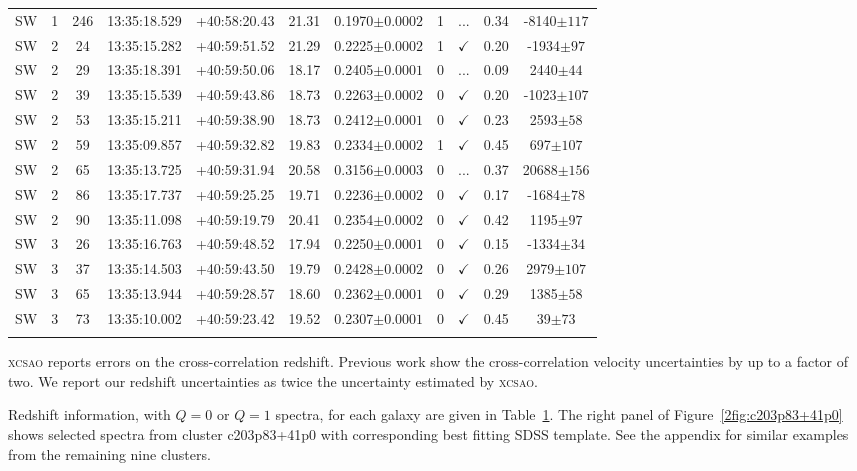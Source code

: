 \begin{landscape}
\begin{longtable}{ccccccccccc}
	SW & 1 & 246 & 13:35:18.529 & +40:58:20.43 & 21.31 & 0.1970$\pm{0.0002}$ & 1 & ... & 0.34 & -8140$\pm{117}$ \\
	SW & 2 & 24 & 13:35:15.282 & +40:59:51.52 & 21.29 & 0.2225$\pm{0.0002}$ & 1 & $\checkmark$ & 0.20 & -1934$\pm{97}$ \\
	SW & 2 & 29 & 13:35:18.391 & +40:59:50.06 & 18.17 & 0.2405$\pm{0.0001}$ & 0 & ... & 0.09 & 2440$\pm{44}$ \\
	SW & 2 & 39 & 13:35:15.539 & +40:59:43.86 & 18.73 & 0.2263$\pm{0.0002}$ & 0 & $\checkmark$ & 0.20 & -1023$\pm{107}$ \\
	SW & 2 & 53 & 13:35:15.211 & +40:59:38.90 & 18.73 & 0.2412$\pm{0.0001}$ & 0 & $\checkmark$ & 0.23 & 2593$\pm{58}$ \\
	SW & 2 & 59 & 13:35:09.857 & +40:59:32.82 & 19.83 & 0.2334$\pm{0.0002}$ & 1 & $\checkmark$ & 0.45 & 697$\pm{107}$ \\
	SW & 2 & 65 & 13:35:13.725 & +40:59:31.94 & 20.58 & 0.3156$\pm{0.0003}$ & 0 & ... & 0.37 & 20688$\pm{156}$ \\
	SW & 2 & 86 & 13:35:17.737 & +40:59:25.25 & 19.71 & 0.2236$\pm{0.0002}$ & 0 & $\checkmark$ & 0.17 & -1684$\pm{78}$ \\
	SW & 2 & 90 & 13:35:11.098 & +40:59:19.79 & 20.41 & 0.2354$\pm{0.0002}$ & 0 & $\checkmark$ & 0.42 & 1195$\pm{97}$ \\
	SW & 3 & 26 & 13:35:16.763 & +40:59:48.52 & 17.94 & 0.2250$\pm{0.0001}$ & 0 & $\checkmark$ & 0.15 & -1334$\pm{34}$ \\
	SW & 3 & 37 & 13:35:14.503 & +40:59:43.50 & 19.79 & 0.2428$\pm{0.0002}$ & 0 & $\checkmark$ & 0.26 & 2979$\pm{107}$ \\
	SW & 3 & 65 & 13:35:13.944 & +40:59:28.57 & 18.60 & 0.2362$\pm{0.0001}$ & 0 & $\checkmark$ & 0.29 & 1385$\pm{58}$ \\
	SW & 3 & 73 & 13:35:10.002 & +40:59:23.42 & 19.52 & 0.2307$\pm{0.0001}$ & 0 & $\checkmark$ & 0.45 & 39$\pm{73}$ \\
	\hline 
	\label{2tbl:c203p83+41p0} 
	\end{longtable}
\end{landscape}


\textsc{xcsao} reports errors on the cross-correlation redshift. Previous work  show the cross-correlation velocity uncertainties by up to a factor of two. We report our redshift uncertainties as twice the uncertainty estimated by \textsc{xcsao}.

Redshift information, with $Q=0$ or $Q=1$ spectra, for each galaxy are given in Table~\ref{2tbl:c203p83+41p0}. The right panel of Figure~\ref{2fig:c203p83+41p0} shows selected spectra from cluster c203p83+41p0 with corresponding best fitting SDSS template. See the appendix for similar examples from the remaining nine clusters.

